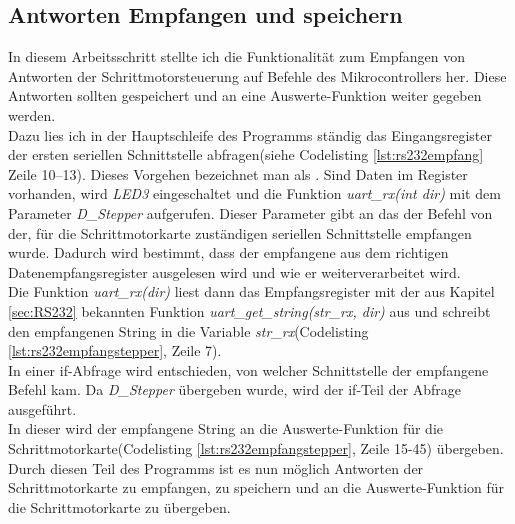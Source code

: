 \subsection{Antworten Empfangen und speichern}
\label{sec:Empfangen_Schrittmotor}
In diesem Arbeitsschritt stellte ich die Funktionalität zum Empfangen von Antworten der Schrittmotorsteuerung auf Befehle des Mikrocontrollers her. Diese Antworten sollten gespeichert und an eine Auswerte-Funktion weiter gegeben werden.\\
Dazu lies ich in der Hauptschleife des Programms ständig das Eingangsregister der ersten seriellen Schnittstelle abfragen(siehe Codelisting \ref{lst:rs232empfang} Zeile 10--13). Dieses Vorgehen bezeichnet man als .
Sind Daten im Register vorhanden, wird \emph{LED3} eingeschaltet und die Funktion \emph{uart\_rx(int dir)} mit dem Parameter \emph{D\_Stepper} aufgerufen. Dieser Parameter gibt an das der Befehl von der, für die Schrittmotorkarte zuständigen seriellen Schnittstelle empfangen wurde. Dadurch wird bestimmt, dass der empfangene  aus dem richtigen Datenempfangsregister ausgelesen wird und wie er weiterverarbeitet wird.\\
Die Funktion \emph{uart\_rx(dir)} liest dann das Empfangsregister mit der aus Kapitel \ref{sec:RS232} bekannten Funktion \emph{uart\_get\_string(str\_rx, dir)} aus und schreibt den empfangenen String in die Variable \emph{str\_rx}(Codelisting \ref{lst:rs232empfangstepper}, Zeile 7).\\
In einer if-Abfrage wird entschieden, von welcher Schnittstelle der empfangene Befehl kam. Da \emph{D\_Stepper} übergeben wurde, wird der if-Teil der Abfrage ausgeführt.\\
In dieser wird der empfangene String an die Auswerte-Funktion  für die Schrittmotorkarte(Codelisting \ref{lst:rs232empfangstepper}, Zeile 15-45) übergeben.
Durch diesen Teil des Programms ist es nun möglich Antworten der Schrittmotorkarte zu empfangen, zu speichern und an die  Auswerte-Funktion für die Schrittmotorkarte zu übergeben.
\lstset{language=C, basicstyle=\footnotesize, showstringspaces=false, tabsize=8}



